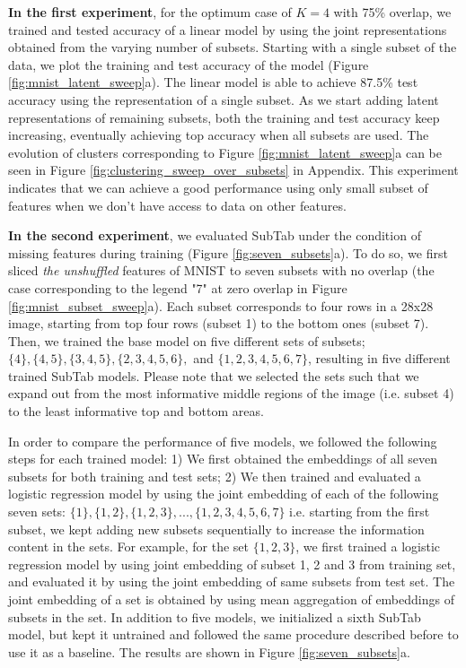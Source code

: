\textbf{In the first experiment}, for the optimum case of $K=4$ with 75\% overlap, we trained and tested accuracy of a linear model by using the joint representations obtained from the varying number of subsets. Starting with a single subset of the data, we plot the training and test accuracy of the model (Figure \ref{fig:mnist_latent_sweep}a). The linear model is able to achieve 87.5\% test accuracy using the representation of a single subset. As we start adding latent representations of remaining subsets, both the training and test accuracy keep increasing, eventually achieving top accuracy when all subsets are used. The evolution of clusters corresponding to Figure \ref{fig:mnist_latent_sweep}a can be seen in Figure \ref{fig:clustering_sweep_over_subsets} in Appendix. This experiment indicates that we can achieve a good performance using only small subset of features when we don't have access to data on other features.

\textbf{In the second experiment}, we evaluated SubTab under the condition of missing features during training (Figure \ref{fig:seven_subsets}a). To do so, we first sliced \emph{the unshuffled} features of MNIST to seven subsets with no overlap (the case corresponding to the legend "7" at zero overlap in Figure \ref{fig:mnist_subset_sweep}a). Each subset corresponds to four rows in a 28x28 image, starting from top four rows (subset 1) to the bottom ones (subset 7). Then, we trained the base model on five different sets of subsets; $\{4\}, \{4, 5\}, \{3, 4, 5\}, \{2, 3, 4, 5, 6\}, $ and $\{1, 2, 3, 4, 5, 6, 7\}$, resulting in five different trained SubTab models. Please note that we selected the sets such that we expand out from the most informative middle regions of the image (i.e. subset 4) to the least informative top and bottom areas.

In order to compare the performance of five models, we followed the following steps for each trained model: 1) We first obtained the embeddings of all seven subsets for both training and test sets; 2) We then trained and evaluated a logistic regression model by using the joint embedding of each of the following seven sets: $\{1\}, \{1, 2\}, \{1, 2, 3\}, ..., \{1, 2, 3, 4, 5, 6, 7\}$ i.e. starting from the first subset, we kept adding new subsets sequentially to increase the information content in the sets. For example, for the set $\{1, 2, 3\}$, we first trained a logistic regression model by using joint embedding of subset 1, 2 and 3 from training set, and evaluated it by using the joint embedding of same subsets from test set. The joint embedding of a set is obtained by using mean aggregation of embeddings of subsets in the set. In addition to five models, we initialized a sixth SubTab model, but kept it untrained and followed the same procedure described before to use it as a baseline. The results are shown in Figure \ref{fig:seven_subsets}a. 

